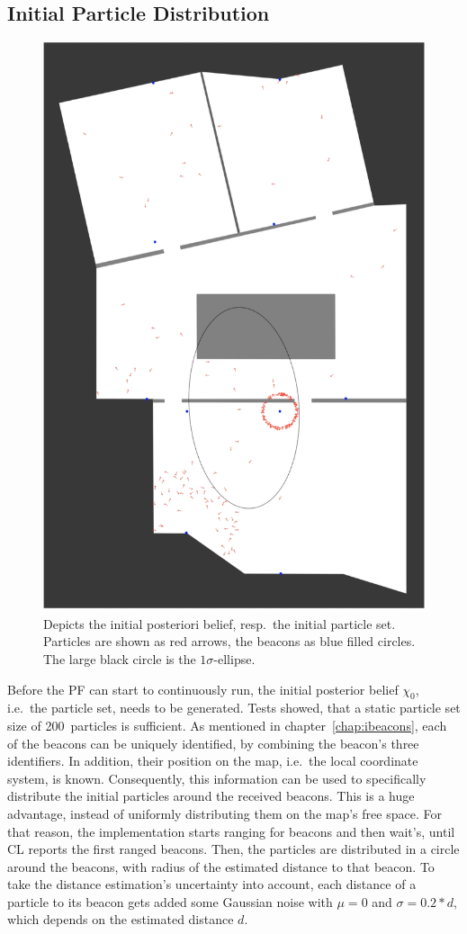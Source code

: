 \subsection{Initial Particle Distribution}\label{sec:algo_initial}

\begin{figure}
\includegraphics[height=0.7\textwidth]{figures/algo_particle_generation}
\caption{Depicts the initial posteriori belief, resp.\ the initial particle set. Particles are shown as red arrows, the beacons as blue filled circles. The large black circle is the $1\sigma$-ellipse.}
\label{fig:pf_initialDist}
\end{figure}

Before the \ac{PF} can start to continuously run, the initial posterior belief $\chi_0$, i.e.\ the particle set, needs to be generated. Tests showed, that a static particle set size of 200~particles is sufficient. As mentioned in chapter~\ref{chap:ibeacons}, each of the beacons can be uniquely identified, by combining the beacon's three identifiers. In addition, their position on the map, i.e.\ the local coordinate system, is known. Consequently, this information can be used to specifically distribute the initial particles around the received beacons. This is a huge advantage, instead of uniformly distributing them on the map's free space. For that reason, the implementation starts ranging for beacons and then wait's, until \ac{CL} reports the first ranged beacons. Then, the particles are distributed in a circle around the beacons, with radius of the estimated distance to that beacon. To take the distance estimation's uncertainty into account, each distance of a particle to its beacon gets added some Gaussian noise with $\mu = 0$ and $\sigma = 0.2 * d$, which depends on the estimated distance $d$. 

